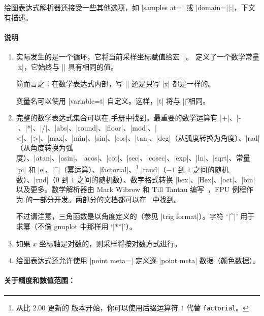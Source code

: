{\begin{addplotoperation}[]{}{}
    绘图表达式解析器还接受一些其他选项，如 |samples at=| 或 |domain=||:|，下文有描述。


    \paragraph{说明}

    \begin{enumerate}
        \item 实际发生的是一个循环，它将当前采样坐标赋值给宏 |\x|。\PGFPlots{} 定义了一个数学常量 |x|，它始终与 |\x| 具有相同的值。

            简而言之：在数学表达式内部，写 |\x| 还是只写 |x| 都是一样的。

            变量名可以使用 |variable=t| 自定义。这样，|t| 将与 |\t| 相同。
        \item 完整的数学表达式集合可以在 \PGF{} 手册中找到。最重要的数学运算有 |+|、|-|、|*|、|/|、|abs|、|round|、|floor|、|mod|、|<|、|>|、|max|、|min|、|sin|、|cos|、|tan|、|deg|（从弧度转换为角度）、|rad|（从角度转换为弧度）、|atan|、|asin|、|acos|、|cot|、|sec|、|cosec|、|exp|、|ln|、|sqrt|、常量 |pi| 和 |e|、|^|（幂运算）、|factorial|、\footnote{从比 2.00 更新的 \PGF{} 版本开始，你可以使用后缀运算符 \texttt{!} 代替 \texttt{factorial}。} |rand|（$-1$ 到 $1$ 之间的随机数）、|rnd|（$0$ 到 $1$ 之间的随机数）、数字格式转换 |hex|、|Hex|、|oct|、|bin| 以及更多。数学解析器由 Mark Wibrow 和 Till Tantau 编写~\cite{tikz}，FPU 例程作为 \PGFPlots{} 的一部分开发。两部分的文档都可以在~\cite{tikz} 中找到。

            不过请注意，三角函数是以角度定义的（参见 |trig format|）。字符 `|^|' 用于求幂（不像 gnuplot 中那样用 `|**|'）。
        \item 如果 $x$ 坐标轴是对数的，则采样将按对数方式进行。
        \item 绘图表达式还允许使用 |point meta=| 定义逐 |point meta| 数据（颜色数据）。
    \end{enumerate}


    \paragraph{关于精度和数值范围：}


\end{addplotoperation}}
